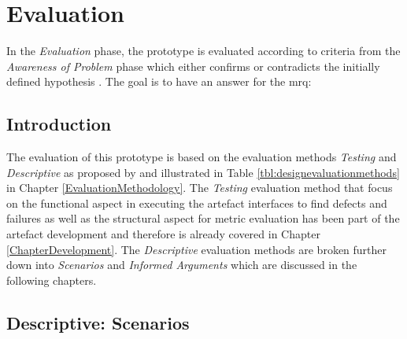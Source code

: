 
\chapter{Evaluation}

\label{ChapterEvaluation}

In the \textit{Evaluation} phase, the prototype is evaluated according to criteria from the \textit{Awareness of Problem} phase which either confirms or contradicts the initially defined hypothesis \citep{Vaishnavi2008}. The goal is to have an answer for the \gls{mrq}:
\begin{framed}
	\textit{\mrqtext}
\end{framed}


\section{Introduction}

The evaluation of this prototype is based on the evaluation methods \textit{Testing} and \textit{Descriptive} as proposed by \cite{Hevner2004} and illustrated in Table \ref{tbl:designevaluationmethods} in Chapter \ref{EvaluationMethodology}. The \textit{Testing} evaluation method that focus on the functional aspect in executing the artefact interfaces to find defects and failures as well as the structural aspect for metric evaluation has been part of the artefact development and therefore is already covered in Chapter \ref{ChapterDevelopment}. The \textit{Descriptive} evaluation methods are broken further down into \textit{Scenarios} and \textit{Informed Arguments} which are discussed in the following chapters.



\section{Descriptive: Scenarios}

